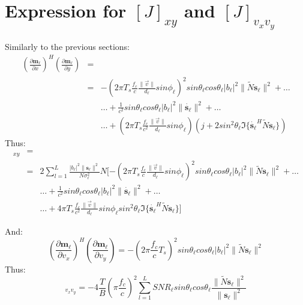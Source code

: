 \section{Expression for $[J]_{x y}$ and $[J]_{v_x v_y}$ }
Similarly to the previous sections:
\begin{eqnarray}
\left(\frac{\partial \mathbf{m_\ell }}{\partial x}\right)^H\left(\frac{\partial \mathbf{m_\ell }}{\partial y}\right) &=& \\
&=& -(2 \pi T_s \frac{f_c}{c}\frac{\|\vec{v}\|}{d_\ell }sin\phi_\ell )^2 sin\theta_\ell  cos\theta_\ell  |b_\ell |^2\|\tilde{N}\mathbf{s_\ell }\|^2 + \dots \nonumber\\
&&\dots + \frac{1}{c^2}sin \theta_\ell  cos\theta_\ell  |b_\ell |^2\|\mathbf{\dot{s_\ell }}\|^2 +\dots \nonumber \\
&&\dots + (2 \pi T_s \frac{f_c}{c^2} \frac{\|\vec{v}\|}{d_\ell }sin\phi_\ell )(j+2sin^2\theta_\ell \Im\{\mathbf{\dot{s_\ell }}^H\tilde{N}\mathbf{s_\ell }\})\nonumber
\end{eqnarray}
Thus:
\begin{eqnarray}
[J]_{xy} &=& \\
&=& 2 \sum_{l=1}^L \frac{|b_\ell |^2\|\mathbf{s_\ell }\|^2}{N\sigma_\ell ^2}N[-(2 \pi T_s \frac{f_c}{c}\frac{\|\vec{v}\|}{d_\ell }sin\phi_\ell )^2 sin\theta_\ell  cos\theta_\ell  |b_\ell |^2\|\tilde{N}\mathbf{s_\ell }\|^2 + \dots \nonumber\\
&&\dots + \frac{1}{c^2}sin \theta_\ell  cos\theta_\ell  |b_\ell |^2\|\mathbf{\dot{s_\ell }}\|^2 +\dots \nonumber \\
&&\dots + 4 \pi T_s \frac{f_c}{c^2} \frac{\|\vec{v}\|}{d_\ell }sin\phi_\ell  sin^2\theta_\ell \Im\{\mathbf{\dot{s_\ell }}^H\tilde{N}\mathbf{s_\ell }\}]\nonumber
\end{eqnarray}

And:
\begin{equation}
\left(\frac{\partial \mathbf{m_\ell }}{\partial v_x}\right)^H\left(\frac{\partial \mathbf{m_\ell }}{\partial v_y}\right) =
 - (2 \pi \frac{f_c}{c} T_s)^2 sin\theta_\ell  cos \theta_\ell  |b_\ell |^2 \|\tilde{N}\mathbf{s_\ell }\|^2 
 \end{equation}
Thus:
\begin{equation}
[J]_{v_xv_y} = -4\frac{T}{B} ( \pi \frac{f_c}{c})^2\sum_{l=1}^L {SNR}_\ell   sin\theta_\ell  cos \theta_\ell   \frac{\|\tilde{N}\mathbf{s_\ell }\|^2}{\|\mathbf{s_\ell }\|^2}
\end{equation}